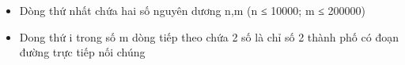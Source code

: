 \begin{itemize}
	\item Dòng thứ nhất chứa hai số nguyên dương n,m (n ≤ 10000; m ≤ 200000)
	\item Dong thứ i trong số m dòng tiếp theo chứa 2 số là chỉ số 2 thành phố có đoạn đường trực tiếp nối chúng
\end{itemize}